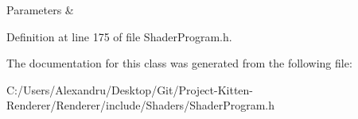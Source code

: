\begin{DoxyParams}{Parameters}
{\em } & \\
\hline
\end{DoxyParams}


Definition at line 175 of file Shader\+Program.\+h.



The documentation for this class was generated from the following file\+:\begin{DoxyCompactItemize}
\item 
C\+:/\+Users/\+Alexandru/\+Desktop/\+Git/\+Project-\/\+Kitten-\/\+Renderer/\+Renderer/include/\+Shaders/Shader\+Program.\+h\end{DoxyCompactItemize}
